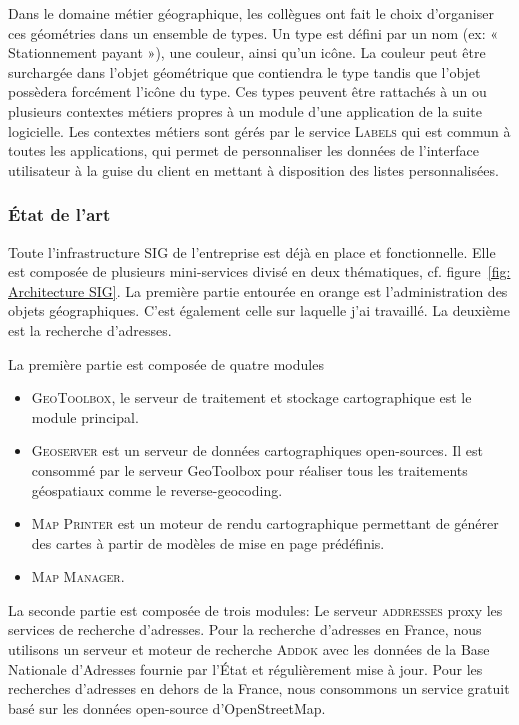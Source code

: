 \documentclass{rapportUHA40}
\begin{document}
Dans le domaine métier géographique, les collègues ont fait le choix
d'organiser ces géométries dans un ensemble de types. Un type est défini par un
nom (ex: « Stationnement payant »), une couleur, ainsi qu'un icône. La couleur
peut être surchargée dans l'objet géométrique que contiendra le type tandis que
l'objet possèdera forcément l'icône du type. Ces types peuvent être rattachés à
un ou plusieurs contextes métiers propres à un module d'une application de la
suite logicielle. Les contextes métiers sont gérés par le service
\textsc{Labels} qui est commun à toutes les applications, qui permet de
personnaliser les données de l'interface utilisateur à la guise du client en
mettant à disposition des listes personnalisées.

\subsubsection{État de l'art}
Toute l'infrastructure SIG de l'entreprise est déjà en place et fonctionnelle.
Elle est composée de plusieurs mini-services divisé en deux thématiques, cf.
figure~\ref{fig: Architecture SIG}. La première partie entourée en orange est
l'administration des objets géographiques. C'est également celle sur laquelle
j'ai travaillé. La deuxième est la recherche d'adresses.

La première partie est composée de quatre modules
\begin{itemize}
  \item \textsc{GeoToolbox}, le serveur de
        traitement et stockage cartographique est le module principal.
  \item \textsc{Geoserver} est un serveur de données cartographiques open-sources.
        Il est consommé par le serveur GeoToolbox pour réaliser tous les traitements
        géospatiaux comme le \gls{reverse-geocoding}.
  \item \textsc{Map Printer} est un moteur de rendu cartographique permettant de générer
        des cartes à partir de modèles de mise en page prédéfinis.
  \item \textsc{Map Manager}.
\end{itemize}

La seconde partie est composée de trois modules: Le serveur \textsc{addresses}
\gls{proxy} les services de recherche d'adresses. Pour la recherche d'adresses
en France, nous utilisons un serveur et moteur de recherche \textsc{Addok} avec
les données de la Base Nationale d'Adresses fournie par l'État et régulièrement
mise à jour. Pour les recherches d'adresses en dehors de la France, nous
consommons un service gratuit basé sur les données open-source d'OpenStreetMap.
\end{document}

